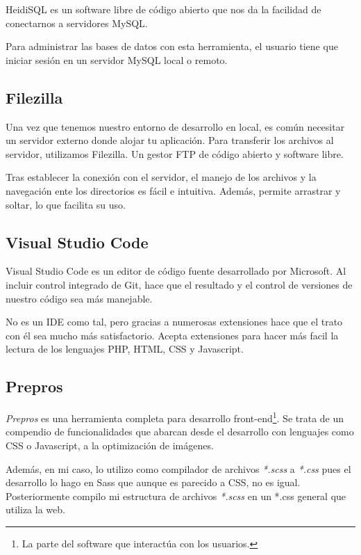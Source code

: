HeidiSQL es un software libre de código abierto que nos da la facilidad de conectarnos a servidores MySQL.

Para administrar las bases de datos con esta herramienta, el usuario tiene que iniciar sesión en un servidor MySQL local o remoto. 

\subsection{Filezilla}

Una vez que tenemos nuestro entorno de desarrollo en local, es común necesitar un servidor externo donde alojar tu aplicación. Para transferir los archivos al servidor, utilizamos Filezilla. Un gestor FTP de código abierto y software libre.

Tras establecer la conexión con el servidor, el manejo de los archivos y la navegación ente los directorios es fácil e intuitiva. Además, permite arrastrar y soltar, lo que facilita su uso.

\subsection{Visual Studio Code}

Visual Studio Code es un editor de código fuente desarrollado por Microsoft. Al incluir control integrado de Git, hace que el resultado y el control de versiones de nuestro código sea más manejable.

No es un IDE como tal, pero gracias a numerosas extensiones hace que el trato con él sea mucho más satisfactorio. Acepta extensiones para hacer más facil la lectura de los lenguajes PHP, HTML, CSS y Javascript. 



\subsection{Prepros}

\textit{Prepros} es una herramienta completa para desarrollo front-end\footnote{La parte del software que interactúa con los usuarios.}. Se trata de un compendio de funcionalidades que abarcan desde el desarrollo con lenguajes como CSS o Javascript, a la optimización de imágenes.

Además, en mi caso, lo utilizo como compilador de archivos \textit{*.scss} a \textit{*.css} pues el desarrollo lo hago en Sass que aunque es parecido a CSS, no es igual. Posteriormente compilo mi estructura de archivos \textit{*.scss} en un *.css general que utiliza la web.

